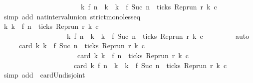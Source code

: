 \begin{isabellebody}
\ \ \ \ \ \ \ \ \ \ \ \ \ \ \ \ \ \ \ \ \ \ {\isasymunion}\ {\isacharbraceleft}k{\isachardot}\ f\ n\ {\isacharless}\ k\ {\isasymand}\ k\ {\isasymle}\ f\ {\isacharparenleft}Suc\ n{\isacharparenright}\ {\isasymand}\ ticks\ {\isacharparenleft}{\isacharparenleft}Rep{\isacharunderscore}run\ r{\isacharparenright}\ k\ c{\isacharparenright}{\isacharbraceright}{\isacartoucheclose}\isanewline
\ \ \ \ \isamarkupfalse%
\ {\isacharparenleft}simp\ add{\isacharcolon}\ nat{\isacharunderscore}interval{\isacharunderscore}union\ strict{\isacharunderscore}mono{\isacharunderscore}less{\isacharunderscore}eq{\isacharparenright}\isanewline
\ \ \isamarkupfalse%
\ \isamarkupfalse%
\ {\isacartoucheopen}{\isacharbraceleft}k{\isachardot}\ k\ {\isasymle}\ f\ n\ {\isasymand}\ ticks\ {\isacharparenleft}{\isacharparenleft}Rep{\isacharunderscore}run\ r{\isacharparenright}\ k\ c{\isacharparenright}{\isacharbraceright}\isanewline
\ \ \ \ \ \ \ \ \ \ \ \ \ \ \ \ \ \ {\isasyminter}\ {\isacharbraceleft}k{\isachardot}\ f\ n\ {\isacharless}\ k\ {\isasymand}\ k\ {\isasymle}\ f\ {\isacharparenleft}Suc\ n{\isacharparenright}\ {\isasymand}\ ticks\ {\isacharparenleft}{\isacharparenleft}Rep{\isacharunderscore}run\ r{\isacharparenright}\ k\ c{\isacharparenright}{\isacharbraceright}\ {\isacharequal}\ {\isacharbraceleft}{\isacharbraceright}{\isacartoucheclose}\isanewline
\ \ \ \ \ \isamarkupfalse%
\ auto\isanewline
\ \ \isamarkupfalse%
\ \isamarkupfalse%
\ {\isacartoucheopen}card\ {\isacharbraceleft}k{\isachardot}\ k\ {\isasymle}\ f\ {\isacharparenleft}Suc\ n{\isacharparenright}\ {\isasymand}\ ticks\ {\isacharparenleft}Rep{\isacharunderscore}run\ r\ k\ c{\isacharparenright}{\isacharbraceright}\ {\isacharequal}\isanewline
\ \ \ \ \ \ \ \ \ \ \ \ \ \ \ \ \ \ \ \ \ \ card\ {\isacharbraceleft}k{\isachardot}\ k\ {\isasymle}\ f\ n\ {\isasymand}\ ticks\ {\isacharparenleft}Rep{\isacharunderscore}run\ r\ k\ c{\isacharparenright}{\isacharbraceright}\isanewline
\ \ \ \ \ \ \ \ \ \ \ \ \ \ \ \ \ \ \ \ {\isacharplus}\ card\ {\isacharbraceleft}k{\isachardot}\ f\ n\ {\isacharless}\ k\ {\isasymand}\ k\ {\isasymle}\ f\ {\isacharparenleft}Suc\ n{\isacharparenright}\ {\isasymand}\ ticks\ {\isacharparenleft}Rep{\isacharunderscore}run\ r\ k\ c{\isacharparenright}{\isacharbraceright}{\isacartoucheclose}\isanewline
\ \ \ \ \isamarkupfalse%
\ {\isacharparenleft}simp\ add{\isacharcolon}\ {\isacharasterisk}\ card{\isacharunderscore}Un{\isacharunderscore}disjoint{\isacharparenright}\isanewline
\ \ \isamarkupfalse%

\end{isabellebody}

